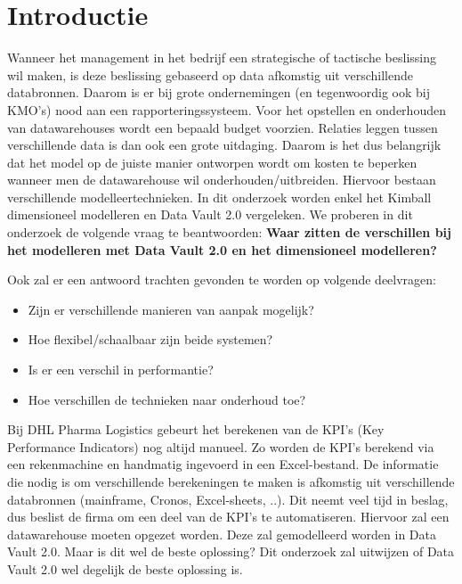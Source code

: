 
\section{Introductie} %
\label{sec:introductie}

Wanneer het management in het bedrijf een strategische of tactische beslissing wil maken, is deze beslissing gebaseerd op data afkomstig uit verschillende databronnen. Daarom is er bij grote ondernemingen (en tegenwoordig ook bij KMO’s) nood aan een rapporteringssysteem. Voor het opstellen en onderhouden van datawarehouses wordt een bepaald budget voorzien. Relaties leggen tussen verschillende data is dan ook een grote uitdaging. Daarom is het dus belangrijk dat het model op de juiste manier ontworpen wordt om kosten te beperken wanneer men de datawarehouse wil onderhouden/uitbreiden. Hiervoor bestaan verschillende modelleertechnieken. In dit onderzoek worden enkel het Kimball dimensioneel modelleren en Data Vault 2.0 vergeleken. We proberen in dit onderzoek de volgende vraag te beantwoorden: \textbf{Waar zitten de verschillen bij het modelleren met Data Vault 2.0 en het dimensioneel modelleren?}

Ook zal er een antwoord trachten gevonden te worden op volgende deelvragen:

\begin{itemize}
	\item Zijn er verschillende manieren van aanpak mogelijk?
	\item Hoe flexibel/schaalbaar zijn beide systemen?
	\item Is er een verschil in performantie?
	\item Hoe verschillen de technieken naar onderhoud toe?
\end{itemize}

Bij DHL Pharma Logistics gebeurt het berekenen van de KPI's (Key Performance Indicators) nog altijd manueel. Zo worden de KPI's berekend via een rekenmachine en handmatig ingevoerd in een Excel-bestand. De informatie die nodig is om verschillende berekeningen te maken is afkomstig uit verschillende databronnen (mainframe, Cronos, Excel-sheets, ..). Dit neemt veel tijd in beslag, dus beslist de firma om een deel van de KPI's te automatiseren. Hiervoor zal een datawarehouse moeten opgezet worden. Deze zal gemodelleerd worden in Data Vault 2.0. Maar is dit wel de beste oplossing? Dit onderzoek zal uitwijzen of Data Vault 2.0 wel degelijk de beste oplossing is.

